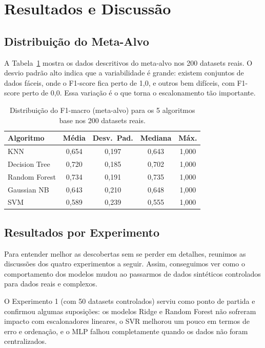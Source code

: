 \documentclass[12pt]{article}
\begin{document}
\section{Resultados e Discussão}

\subsection{Distribuição do Meta-Alvo}

A Tabela~\ref{tab:base_perf} mostra os dados descritivos do meta-alvo nos 200 datasets reais. O desvio padrão alto indica que a variabilidade é grande: existem conjuntos de dados fáceis, onde o F1-score fica perto de 1,0, e outros bem difíceis, com F1-score perto de 0,0. Essa variação é o que torna o escalonamento tão importante.

\begin{table}[H]
\centering
\caption{Distribuição do F1-macro (meta-alvo) para os 5 algoritmos base nos 200 datasets reais.}
\label{tab:base_perf}
\small
\begin{tabular}{lcccc}
\toprule
\textbf{Algoritmo} & \textbf{Média} & \textbf{Desv.\ Pad.} & \textbf{Mediana} & \textbf{Máx.} \\
\midrule
KNN           & 0,654 & 0,197 & 0,643 & 1,000 \\
Decision Tree & 0,720 & 0,185 & 0,702 & 1,000 \\
Random Forest & 0,734 & 0,191 & 0,735 & 1,000 \\
Gaussian NB   & 0,643 & 0,210 & 0,648 & 1,000 \\
SVM           & 0,589 & 0,239 & 0,555 & 1,000 \\
\bottomrule
\end{tabular}
\end{table}

\subsection{Resultados por Experimento}

Para entender melhor as descobertas sem se perder em detalhes, reunimos as discussões dos quatro experimentos a seguir. Assim, conseguimos ver como o comportamento dos modelos mudou ao passarmos de dados sintéticos controlados para dados reais e complexos.

O Experimento 1 (com 50 datasets controlados) serviu como ponto de partida e confirmou algumas suposições: os modelos Ridge e Random Forest não sofreram impacto com escalonadores lineares, o SVR melhorou um pouco em termos de erro e ordenação, e o MLP falhou completamente quando os dados não foram centralizados.
\end{document}
